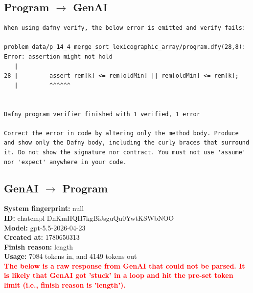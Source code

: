\documentclass{article}
\begin{document}
\subsection*{Program $\rightarrow$ GenAI}
\begin{lstlisting}
When using dafny verify, the below error is emitted and verify fails:

problem_data/p_14_4_merge_sort_lexicographic_array/program.dfy(28,8): Error: assertion might not hold
   |
28 |         assert rem[k] <= rem[oldMin] || rem[oldMin] <= rem[k];
   |         ^^^^^^


Dafny program verifier finished with 1 verified, 1 error

Correct the error in code by altering only the method body. Produce and show only the Dafny body, including the curly braces that surround it. Do not show the signature nor contract. You must not use 'assume' nor 'expect' anywhere in your code.
\end{lstlisting}
\subsection*{GenAI $\rightarrow$ Program}
\textbf{System fingerprint: }null
\\\textbf{ID: }chatcmpl-DnKmHQH7kgBiJsguQu0YwtKSWbNOO
\\\textbf{Model: }gpt-5.5-2026-04-23
\\\textbf{Created at: }1780650313
\\\textbf{Finish reason: }length
\\\textbf{Usage: }7084 tokens in, and 4149 tokens out
\\\textcolor{red}{\textbf{The below is a raw response from GenAI that could not be parsed. It is likely that GenAI got 'stuck' in a loop and hit the pre-set token limit (i.e., finish reason is 'length').}}
\begin{lstlisting}

\end{lstlisting}
\end{document}

